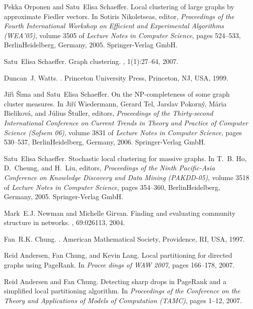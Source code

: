 \documentclass{article}
\begin{document}
\begin{thebibliography}{10}
Pekka Orponen and Satu~Elisa Schaeffer.
\newblock Local clustering of large graphs by approximate {F}iedler vectors.
\newblock In Sotiris Nikoletseas, editor, {\em Proceedings of the Fourth
  International Workshop on Efficient and Experimental Algorithms (WEA'05)},
  volume 3505 of {\em Lecture Notes in Computer Science}, pages 524--533,
  BerlinHeidelberg, Germany, 2005. Springer-Verlag GmbH.

Satu~Elisa Schaeffer.
\newblock Graph clustering.
, 1(1):27--64, 2007.

Duncan~J. Watts.
.
\newblock Princeton University Press, Princeton, NJ, USA, 1999.

Ji{\v{r}}{\'{\i}} {\v{S}}{\'{\i}}ma and Satu~Elisa Schaeffer.
\newblock On the {NP}-completeness of some graph cluster measures.
\newblock In Ji{\v{r}}{\'{i}} Wiedermann, Gerard Tel, Jarslav Pokorn{\'{y}},
  M{\'{a}}ria Bielikov{\'{a}}, and J{\'{u}}lius {\v{S}}tuller, editors, {\em
  Proceedings of the Thirty-second International Conference on Current Trends
  in Theory and Practice of Computer Science (Sofsem 06)}, volume 3831 of {\em
  Lecture Notes in Computer Science}, pages 530--537, BerlinHeidelberg,
  Germany, 2006. Springer-Verlag GmbH.

Satu~Elisa Schaeffer.
\newblock Stochastic local clustering for massive graphs.
\newblock In T.~B. Ho, D.~Cheung, and H.~Liu, editors, {\em Proceedings of the
  Ninth Pacific-Asia Conference on Knowledge Discovery and Data Mining
  (PAKDD-05)}, volume 3518 of {\em Lecture Notes in Computer Science}, pages
  354--360, BerlinHeidelberg, Germany, 2005. Springer-Verlag GmbH.

Mark~E.J. Newman and Michelle Girvan.
\newblock Finding and evaluating community structure in networks.
, 69:026113, 2004.

Fan~R.K. Chung.
.
\newblock American Mathematical Society, Providence, RI, USA, 1997.

Reid Andersen, Fan Chung, and Kevin Lang.
\newblock Local partitioning for directed graphs using {P}age{R}ank.
\newblock In {\em Procee dings of WAW 2007}, pages 166--178, 2007.

Reid Andersen and Fan Chung.
\newblock Detecting sharp drops in {P}age{R}ank and a simplified local
  partitioning algorithm.
\newblock In {\em Proceedings of the Conference on the Theory and Applications
  of Models of Computation (TAMC)}, pages 1--12, 2007.


\end{thebibliography}
\end{document}
